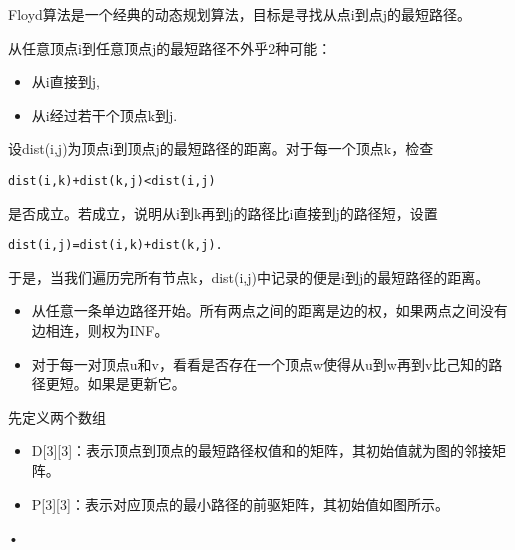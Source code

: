 \begin{frame}\ft{\subsubsecname}
\tf {} Floyd算法是一个经典的动态规划算法，目标是寻找从点i到点j的最短路径。
\vspace{0.1in}

从任意顶点i到任意顶点j的最短路径不外乎2种可能：
\begin{itemize}
\item 从i直接到j,
\item 从i经过若干个顶点k到j.
\end{itemize}
\end{frame}




\begin{frame}[fragile]\ft{\subsubsecname}
\tf 设dist(i,j)为顶点i到顶点j的最短路径的距离。对于每一个顶点k，检查
\begin{lstlisting}
dist(i,k)+dist(k,j)<dist(i,j)
\end{lstlisting}
是否成立。若成立，说明从i到k再到j的路径比i直接到j的路径短，设置
\begin{lstlisting}
dist(i,j)=dist(i,k)+dist(k,j).
\end{lstlisting}
于是，当我们遍历完所有节点k，dist(i,j)中记录的便是i到j的最短路径的距离。


\end{frame}


\begin{frame}\ft{\subsubsecname}
\tf {}  

\begin{itemize}
\item \tf 从任意一条单边路径开始。所有两点之间的距离是边的权，如果两点之间没有边相连，则权为INF。\\[0.1in]
\item \tf 对于每一对顶点u和v，看看是否存在一个顶点w使得从u到w再到v比己知的路径更短。如果是更新它。
\end{itemize}
\end{frame}

\begin{frame}\ft{\subsubsecname}
\begin{figure}
\centering

\end{figure}
\end{frame}

\begin{frame}\ft{\subsubsecname}
\tf 先定义两个数组
\begin{itemize}
\item D[3][3]：表示顶点到顶点的最短路径权值和的矩阵，其初始值就为图的邻接矩阵。\\[0.1in]
\item P[3][3]：表示对应顶点的最小路径的前驱矩阵，其初始值如图所示。
\end{itemize}•
\end{frame}

